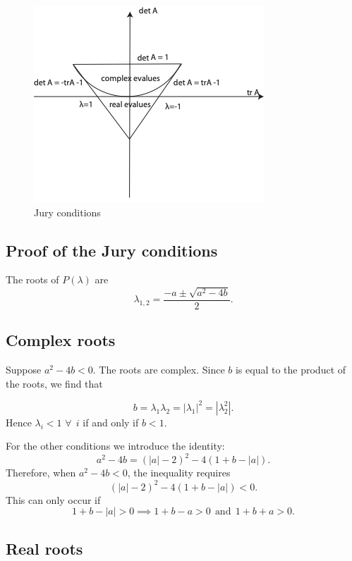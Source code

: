\documentclass[
  letterpaper,
  DIV=11,
  numbers=noendperiod]{scrreprt}
\begin{document}
\begin{figure}

{\centering \includegraphics{JuryConditions2D.png}

}

\caption{\label{fig-juryconditions}Jury conditions}

\end{figure}

\hypertarget{proof-of-the-jury-conditions}{%
\subsection{Proof of the Jury
conditions}\label{proof-of-the-jury-conditions}}

The roots of \(P(\lambda)\) are \[
\lambda_{1,2}=\frac{-a \pm \sqrt{a^2-4b}}{2}.
\]

\hypertarget{complex-roots}{%
\subsection{Complex roots}\label{complex-roots}}

Suppose \(a^2-4b< 0\). The roots are complex. Since \(b\) is equal to
the product of the roots, we find that

\[
b=\lambda_1\lambda_2 = |\lambda_1|^2 = |\lambda_2^2|.
\] Hence \(\lambda_i<1\) \(\forall \ \ i\) if and only if \(b<1\).

For the other conditions we introduce the identity: \[
a^2-4b=(|a|-2)^2 - 4(1+b-|a|).
\] Therefore, when \(a^2-4b<0\), the inequality requires \[
(|a|-2)^2 - 4(1+b-|a|)<0.
\] This can only occur if \[
1+b-|a| >0 \implies 1+b-a>0 \ \ \textrm{and} \ \  1+b+a>0.
\]

\hypertarget{real-roots}{%
\subsection{Real roots}\label{real-roots}}
\end{document}
